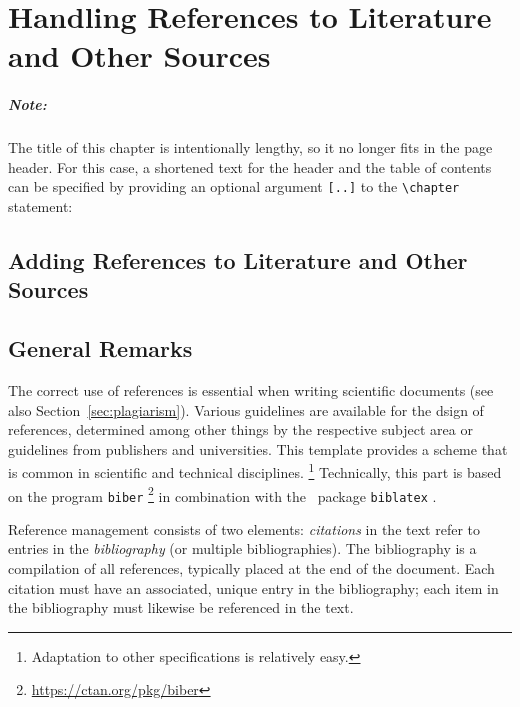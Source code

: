 \chapter[References to Literature]{Handling References to Literature and Other Sources}
\label{cha:Literature}

\paragraph{Note:} The title of this chapter is intentionally lengthy, so it no
longer fits in the page header. For this case, a shortened text for the header
and the table of contents can be specified by providing an
optional argument \verb![..]! to the \verb!\chapter! statement:
%
\begin{LaTeXCode}[numbers=none]
\chapter[References to Literature]{Adding References to Literature and Other Sources}
\end{LaTeXCode}


\section{General Remarks}

The correct use of references is essential when writing scientific documents
(see also Section~\ref{sec:plagiarism}). Various guidelines are available for
the dsign of references, determined among other things by the respective 
subject area or guidelines from publishers and universities. 
This template provides a scheme that is common in scientific and technical
disciplines.%
\footnote{Adaptation to other specifications is relatively easy.}
Technically, this part is based on the program \texttt{biber}%
\footnote{\url{https://ctan.org/pkg/biber}}
in combination with the \latex\ package \texttt{biblatex} \cite{Kime2022}.

Reference management consists of two elements: \emph{citations} in the text
refer to entries in the \emph{bibliography} (or multiple bibliographies). The
bibliography is a compilation of all references, typically placed at the end of
the document. Each citation must have an associated, unique entry in the
bibliography; each item in the bibliography must likewise be referenced in the
text.


